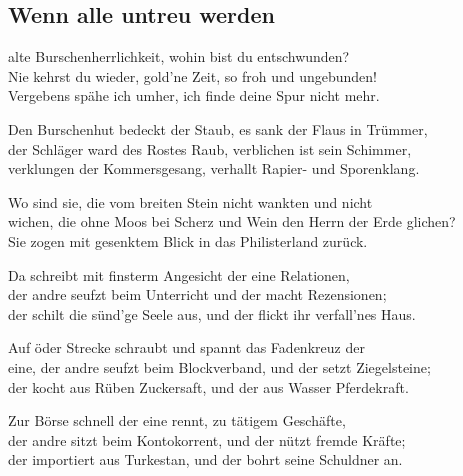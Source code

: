 
\subsection*{Wenn alle untreu werden}
%


 alte Burschenherrlichkeit, wohin bist du entschwunden? \\
Nie kehrst du wieder, gold'ne Zeit, so froh und ungebunden! \\
Vergebens spähe ich umher, ich finde deine Spur nicht mehr. \\

\thestrophe Den Burschenhut bedeckt der Staub, es sank der Flaus in Trümmer, \\
der Schläger ward des Rostes Raub, verblichen ist sein Schimmer, \\
verklungen der Kommersgesang, verhallt Rapier- und Sporenklang. \\

\thestrophe Wo sind sie, die vom breiten Stein nicht wankten und nicht \\
wichen, die ohne Moos bei Scherz und Wein den Herrn der Erde glichen? \\
Sie zogen mit gesenktem Blick in das Philisterland zurück. \\

\thestrophe Da schreibt mit finsterm Angesicht der eine Relationen, \\
der andre seufzt beim Unterricht und der macht Rezensionen; \\
der schilt die sünd'ge Seele aus, und der flickt ihr verfall'nes Haus. \\

\thestrophe Auf öder Strecke schraubt und spannt das Fadenkreuz der \\
eine, der andre seufzt beim Blockverband, und der setzt Ziegelsteine; \\
der kocht aus Rüben Zuckersaft, und der aus Wasser Pferdekraft. \\

\thestrophe Zur Börse schnell der eine rennt, zu tätigem Geschäfte, \\
der andre sitzt beim Kontokorrent, und der nützt fremde Kräfte; \\
der importiert aus Turkestan, und der bohrt seine Schuldner an. \\

